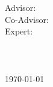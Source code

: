 \begin{titlepage}
    \vspace{6em}
	\begin{center}
		\Huge{\textbf{\thesisname}} \\
		\vspace{6em}
		\LARGE{\authorname} \\
		\vspace{6em}
		\Large{Advisor: \advisorname} \\
		\vspace{0.5em}
		\Large{Co-Advisor: \coadvisorname} \\
		\vspace{0.5em}
		\Large{Expert: \expertname} \\
		\vspace{4cm}
		\large{\titlename} \\
		\large{\kindofthesis} \\
		\large{\schoolname} \\
		\large{\today} \\
	\end{center}
\end{titlepage}
\clearpage